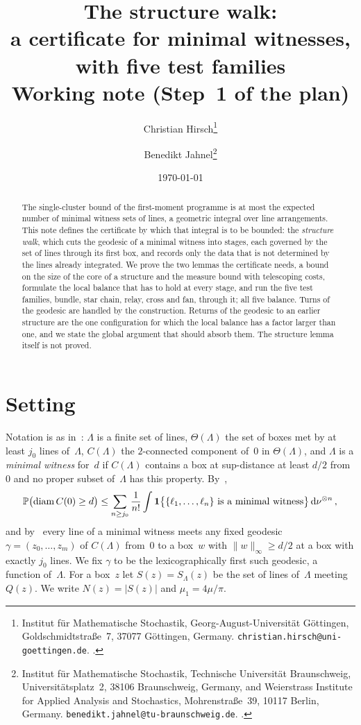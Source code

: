 \documentclass[11pt,letterpaper]{article}
\title{\textbf{The structure walk:\\ a certificate for minimal witnesses,\\ with five test families}\\[0.6em] \large Working note (Step~1 of the plan)}
\author{%
  Christian Hirsch\thanks{Institut f\"ur Mathematische Stochastik, Georg-August-Universit\"at G\"ottingen, Goldschmidtstra\ss e~7, 37077 G\"ottingen, Germany. \texttt{christian.hirsch@uni-goettingen.de}. \orcid{0000-0003-4136-3740}.}
  \and
  Benedikt Jahnel\thanks{Institut f\"ur Mathematische Stochastik, Technische Universit\"at Braunschweig, Universit\"atsplatz~2, 38106 Braunschweig, Germany, and Weierstrass Institute for Applied Analysis and Stochastics, Mohrenstra\ss e~39, 10117 Berlin, Germany. \texttt{benedikt.jahnel@tu-braunschweig.de}. \orcid{0000-0002-4212-0065}.}%
}
\date{\today}
\DeclareMathOperator{\diam}{diam}
\begin{document}
\maketitle
\thispagestyle{plain}

\begin{abstract}
The single-cluster bound of the first-moment programme is at most the expected number of minimal witness sets of lines, a geometric integral over line arrangements. This note defines the certificate by which that integral is to be bounded: the \emph{structure walk}, which cuts the geodesic of a minimal witness into stages, each governed by the set of lines through its first box, and records only the data that is not determined by the lines already integrated. We prove the two lemmas the certificate needs, a bound on the size of the core of a structure and the measure bound with telescoping costs, formulate the local balance that has to hold at every stage, and run the five test families, bundle, star chain, relay, cross and fan, through it; all five balance. Turns of the geodesic are handled by the construction. Returns of the geodesic to an earlier structure are the one configuration for which the local balance has a factor larger than one, and we state the global argument that should absorb them. The structure lemma itself is not proved.
\end{abstract}

\section{Setting}
\label{sec:setting}

Notation is as in~\cite{DEC26}: $\Lambda$ is a finite set of lines, $\Theta(\Lambda)$ the set of boxes met by at least $j_0$ lines of~$\Lambda$, $C(\Lambda)$ the $2$-connected component of~$0$ in $\Theta(\Lambda)$, and $\Lambda$ is a \emph{minimal witness} for~$d$ if $C(\Lambda)$ contains a box at sup-distance at least $d/2$ from~$0$ and no proper subset of~$\Lambda$ has this property. By~\cite[Proposition~6.2]{DEC26},
\begin{equation}
\label{eq:witness}
  \P\bigl(\diam C(0)\ge d\bigr)\le\sum_{n\ge j_0}\frac1{n!}\int\1\bigl\{\{\ell_1,\dots,\ell_n\}\text{ is a minimal witness}\bigr\}\dd\nu^{\otimes n}\,,
\end{equation}
and by~\cite[Lemma~7.1]{DEC26} every line of a minimal witness meets any fixed geodesic $\gamma=(z_0,\dots,z_m)$ of $C(\Lambda)$ from~$0$ to a box~$w$ with $\lVert w\rVert_\infty\ge d/2$ at a box with exactly $j_0$ lines. We fix $\gamma$ to be the lexicographically first such geodesic, a function of~$\Lambda$. For a box~$z$ let $S(z)=S_\Lambda(z)$ be the set of lines of~$\Lambda$ meeting $Q(z)$. We write $N(z)=\lvert S(z)\rvert$ and $\mu_1=4\mu/\pi$.
\end{document}
